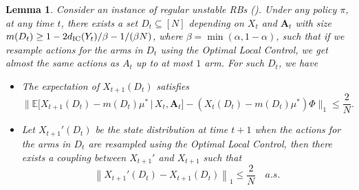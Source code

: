 \documentclass[11pt,letterpaper]{article}
\theoremstyle{plain}
\newtheorem{lemma}{Lemma}
\theoremstyle{definition}
\theoremstyle{remark}
\newcommand{\norm}[1]{\left\lVert#1\right\rVert}
\newcommand{\normbig}[1]{\big\lVert#1\big\rVert}
\newcommand{\Ebig}[1]{\mathbb{E}\big[#1\big]}
\newcommand{\givenbig}{\,\big|\,}
\newcommand{\ve}[1]{\bm{#1}}
\newcommand{\veA}{\ve{A}}
\newcommand{\statdist}{\mu^*}
\newcommand{\disy}{d_{\textup{IC}}}
\begin{document}
\begin{lemma}\label{lem:exist-subset-lp-priority}
    Consider an instance of regular unstable RBs (). Under any policy $\pi$, at any time $t$, there exists a set $D_t\subseteq[N]$ depending on $X_t$ and $\veA_t$ with size $m(D_t) \geq 1 - 2\disy(Y_t)/\beta - 1/(\beta N)$, where $\beta = \min(\alpha,1-\alpha)$, 
    such that if we resample actions for the arms in $D_t$ using the Optimal Local Control, we get almost the same actions as $A_t$ up to at most $1$ arm. 
    For such $D_t$, we have
    \begin{itemize}[leftmargin=1em]
        \item The expectation of $X_{t+1}(D_t)$ satisfies
        \begin{equation}
        \label{eq:subset-lp-priority}
            \normbig{\Ebig{X_{t+1}(D_t) - m(D_t) \statdist \givenbig X_t, \veA_t} - (X_t(D_t)- m(D_t)\statdist)\Phi}_1 \leq \frac{2}{N}.
        \end{equation}
        \item Let $X_{t+1}'(D_t)$ be the state distribution at time $t+1$ when the actions for the arms in $D_t$ are resampled using the Optimal Local Control, then there exists a coupling between $X_{t+1}'$ and $X_{t+1}$ such that 
        \begin{equation}
            \label{eq:subset-lp-priority-as}
            \norm{X_{t+1}'(D_t) - X_{t+1}(D_t)}_1 \leq \frac{2}{N} \quad a.s.
        \end{equation}
    \end{itemize}
\end{lemma}
\end{document}
